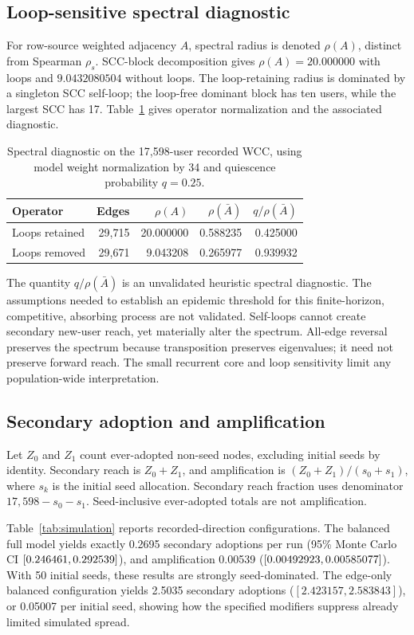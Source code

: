 \documentclass[11pt,a4paper]{article}
\begin{document}
\subsection{Loop-sensitive spectral diagnostic}
For row-source weighted adjacency $A$, spectral radius is denoted $\rho(A)$, distinct from Spearman $\rho_s$. SCC-block decomposition gives $\rho(A)=20.000000$ with loops and $9.0432080504$ without loops. The loop-retaining radius is dominated by a singleton SCC self-loop; the loop-free dominant block has ten users, while the largest SCC has 17. Table~\ref{tab:spectral} gives operator normalization and the associated diagnostic.
\begin{table}[htbp]\centering\small
\caption{Spectral diagnostic on the 17,598-user recorded WCC, using model weight normalization by 34 and quiescence probability $q=0.25$.}\label{tab:spectral}
\begin{tabular}{lrrrr}\toprule Operator & Edges & $\rho(A)$ & $\rho(\bar A)$ & $q/\rho(\bar A)$\\\midrule
Loops retained & 29,715 & 20.000000 & 0.588235 & 0.425000\\
Loops removed & 29,671 & 9.043208 & 0.265977 & 0.939932\\
\bottomrule\end{tabular}\end{table}
The quantity $q/\rho(\bar A)$ is an unvalidated heuristic spectral diagnostic. The assumptions needed to establish an epidemic threshold for this finite-horizon, competitive, absorbing process are not validated. Self-loops cannot create secondary new-user reach, yet materially alter the spectrum. All-edge reversal preserves the spectrum because transposition preserves eigenvalues; it need not preserve forward reach. The small recurrent core and loop sensitivity limit any population-wide interpretation.

\subsection{Secondary adoption and amplification}
Let $Z_0$ and $Z_1$ count ever-adopted non-seed nodes, excluding initial seeds by identity. Secondary reach is $Z_0+Z_1$, and amplification is $(Z_0+Z_1)/(s_0+s_1)$, where $s_k$ is the initial seed allocation. Secondary reach fraction uses denominator $17{,}598-s_0-s_1$. Seed-inclusive ever-adopted totals are not amplification.

Table~\ref{tab:simulation} reports recorded-direction configurations. The balanced full model yields exactly 0.2695 secondary adoptions per run (95\% Monte Carlo CI $[0.246461,0.292539]$), and amplification 0.00539 ($[0.00492923,0.00585077]$). With 50 initial seeds, these results are strongly seed-dominated. The edge-only balanced configuration yields 2.5035 secondary adoptions ($[2.423157,2.583843]$), or 0.05007 per initial seed, showing how the specified modifiers suppress already limited simulated spread.

\end{document}
